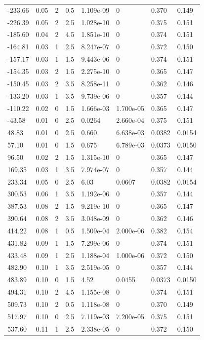 \documentclass[preview]{standalone}
\begin{document}
{{\begin{tabular}{L{1.2cm}C{1.2cm} C{0.3cm}C{0.5cm} C{1.4cm}C{1.4cm} C{1.4cm}C{1.4cm}}
  -233.66  &  0.05  & 2     & 0.5 &  1.109e-09  & 0  & 0.370 &  0.149   \\ 
  -226.39  &  0.05  & 2     & 2.5 &  1.028e-10  & 0  & 0.375 &  0.151   \\ 
  -185.60  &  0.04  & 2     & 4.5 &  1.851e-10  & 0  & 0.374 &  0.151   \\ 
  -164.81  &  0.03  & 1     & 2.5 &  8.247e-07  & 0  & 0.372 &  0.150   \\ 
  -157.17  &  0.03  & 1     & 1.5 &  9.443e-06  & 0  & 0.374 &  0.151   \\ 
  -154.35  &  0.03  & 2     & 1.5 &  2.275e-10  & 0  & 0.365 &  0.147   \\ 
  -150.45  &  0.03  & 2     & 3.5 &  8.258e-11  & 0  & 0.362 &  0.146   \\ 
  -133.20  &  0.03  & 1     & 3.5 &  9.739e-06  & 0  & 0.357 &  0.144   \\ 
  -110.22  &  0.02  & 0     & 1.5 &  1.666e-03  & 1.700e-05  & 0.365 &  0.147   \\ 
  -43.58  &  0.01  & 0     & 2.5 &  0.0264  & 2.660e-04  & 0.375 &  0.151   \\ 
  48.83  &  0.01  & 0     & 2.5 &  0.660  & 6.638e-03  & 0.0382 &  0.0154   \\ 
  57.10  &  0.01  & 0     & 1.5 &  0.675  & 6.789e-03  & 0.0373 &  0.0150   \\ 
  96.50  &  0.02  & 2     & 1.5 &  1.315e-10  & 0  & 0.365 &  0.147   \\ 
  169.35  &  0.03  & 1     & 3.5 &  7.974e-07  & 0  & 0.357 &  0.144   \\ 
  233.34  &  0.05  & 0     & 2.5 &  6.03  & 0.0607  & 0.0382 &  0.0154   \\ 
  300.53  &  0.06  & 1     & 3.5 &  1.192e-06  & 0  & 0.357 &  0.144   \\ 
  387.53  &  0.08  & 2     & 1.5 &  9.219e-10  & 0  & 0.365 &  0.147   \\ 
  390.64  &  0.08  & 2     & 3.5 &  3.048e-09  & 0  & 0.362 &  0.146   \\ 
  414.22  &  0.08  & 1     & 0.5 &  1.509e-04  & 2.000e-06  & 0.382 &  0.154   \\ 
  431.82  &  0.09  & 1     & 1.5 &  7.299e-06  & 0  & 0.374 &  0.151   \\ 
  433.48  &  0.09  & 1     & 2.5 &  1.188e-04  & 1.000e-06  & 0.372 &  0.150   \\ 
  482.90  &  0.10  & 1     & 3.5 &  2.519e-05  & 0  & 0.357 &  0.144   \\ 
  483.89  &  0.10  & 0     & 1.5 &  4.52  & 0.0455  & 0.0373 &  0.0150   \\ 
  494.31  &  0.10  & 2     & 4.5 &  1.155e-08  & 0  & 0.374 &  0.151   \\ 
  509.73  &  0.10  & 2     & 0.5 &  1.118e-08  & 0  & 0.370 &  0.149   \\ 
  517.97  &  0.10  & 0     & 2.5 &  7.119e-03  & 7.200e-05  & 0.375 &  0.151   \\ 
  537.60  &  0.11  & 1     & 2.5 &  2.338e-05  & 0  & 0.372 &  0.150   \\ 
\hline 
\end{tabular} 

}}
\end{document}

